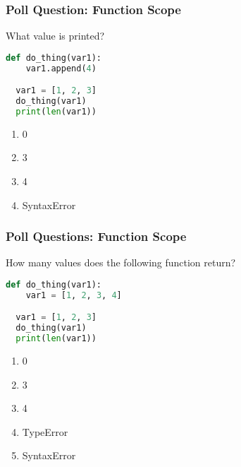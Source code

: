 \documentclass{beamer}
\begin{document}
%
%
\begin{frame}[fragile]
  \frametitle{Poll Question: Function Scope}
  What value is printed?
  \begin{lstlisting}[language=Python, autogobble]
  def do_thing(var1):
    var1.append(4)

  var1 = [1, 2, 3]
  do_thing(var1)
  print(len(var1))
  \end{lstlisting}
  \vfill
  \begin{enumerate}[A]
    \item 0
    \item 3
    \item 4 %
    \item SyntaxError
  \end{enumerate}
\end{frame}

%
%
\begin{frame}[fragile]
  \frametitle{Poll Questions: Function Scope}
  How many values does the following function return?
  \begin{lstlisting}[language=Python, autogobble]
  def do_thing(var1):
    var1 = [1, 2, 3, 4]

  var1 = [1, 2, 3]
  do_thing(var1)
  print(len(var1))
  \end{lstlisting}
  \vfill
  \begin{enumerate}[A]
    \item 0
    \item 3 %
    \item 4
    \item TypeError
    \item SyntaxError
  \end{enumerate}
\end{frame}
\end{document}
